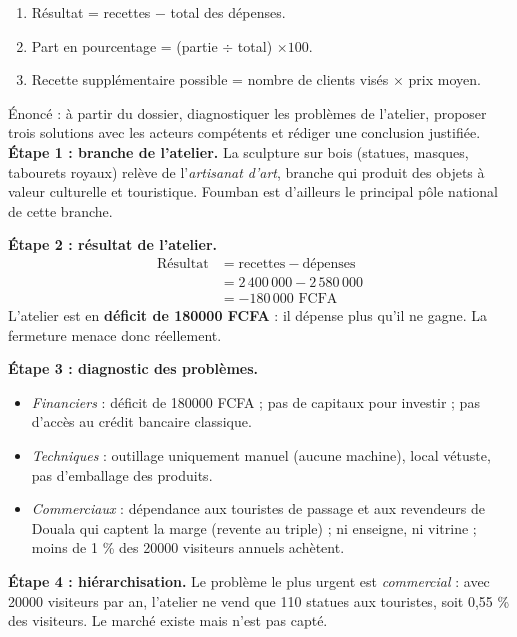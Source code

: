 \documentclass[11pt]{article}
\newcounter{popsec}
\newcounter{popsub}
\newcommand{\courssub}[1]{%
  \stepcounter{popsub}%
  \par\vspace{9pt}\noindent{\popxbold\fontsize{11.5}{13}\selectfont\color{popink}{\color{poporange}\thepopsec.\thepopsub}\hspace{6pt}#1}\par\nopagebreak\vspace{4pt}
}
\begin{document}
\begin{methode}
\begin{enumerate}
\item Résultat = recettes $-$ total des dépenses.
\item Part en pourcentage = (partie $\div$ total) $\times 100$.
\item Recette supplémentaire possible = nombre de clients visés $\times$ prix moyen.
\end{enumerate}
\end{methode}

\courssub{Démarche et corrigé commenté}

\begin{exoresolu}
Énoncé : à partir du dossier, diagnostiquer les problèmes de l'atelier, proposer trois solutions avec les acteurs compétents et rédiger une conclusion justifiée.
\tcblower
\textbf{Étape 1 : branche de l'atelier.} La sculpture sur bois (statues, masques, tabourets royaux) relève de l'\emph{artisanat d'art}, branche qui produit des objets à valeur culturelle et touristique. Foumban est d'ailleurs le principal pôle national de cette branche.

\textbf{Étape 2 : résultat de l'atelier.}
\begin{align*}
\text{Résultat} &= \text{recettes} - \text{dépenses}\\
&= 2\,400\,000 - 2\,580\,000\\
&= -180\,000 \text{ FCFA}
\end{align*}
L'atelier est en \textbf{déficit de \num{180000} FCFA} : il dépense plus qu'il ne gagne. La fermeture menace donc réellement.

\textbf{Étape 3 : diagnostic des problèmes.}
\begin{itemize}
\item \emph{Financiers} : déficit de \num{180000} FCFA ; pas de capitaux pour investir ; pas d'accès au crédit bancaire classique.
\item \emph{Techniques} : outillage uniquement manuel (aucune machine), local vétuste, pas d'emballage des produits.
\item \emph{Commerciaux} : dépendance aux touristes de passage et aux revendeurs de Douala qui captent la marge (revente au triple) ; ni enseigne, ni vitrine ; moins de 1 \% des \num{20000} visiteurs annuels achètent.
\end{itemize}

\textbf{Étape 4 : hiérarchisation.} Le problème le plus urgent est \emph{commercial} : avec \num{20000} visiteurs par an, l'atelier ne vend que 110 statues aux touristes, soit 0,55 \% des visiteurs. Le marché existe mais n'est pas capté.


\end{exoresolu}
\end{document}
